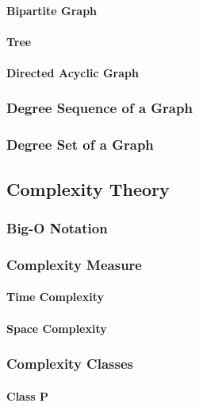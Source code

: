 \documentclass[11pt]{article}
\begin{document}
            \paragraph{Bipartite Graph}
            \paragraph{Tree}
            \paragraph{Directed Acyclic Graph}

       \subsubsection{Degree Sequence of a Graph}

       \subsubsection{Degree Set of a Graph}

  \subsection{Complexity Theory}

       \subsubsection{Big-O Notation}

       \subsubsection{Complexity Measure}
           \paragraph{Time Complexity}
           \paragraph{Space Complexity}

       \subsubsection{Complexity Classes}
           \paragraph{Class P}
\end{document}
